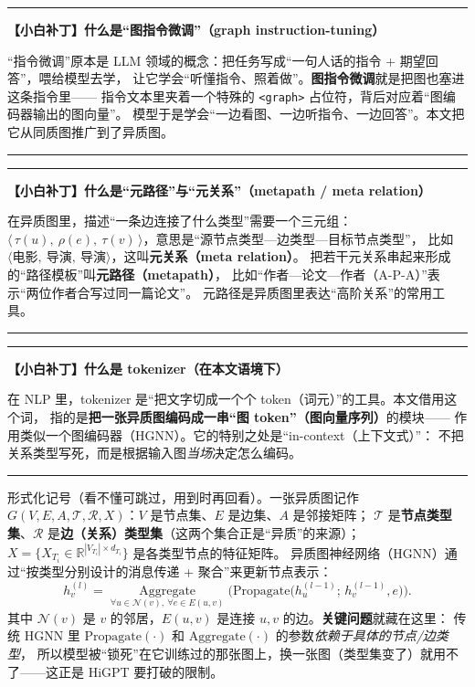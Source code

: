 \documentclass[11pt,UTF8,fontset=fandol]{ctexart}
\newenvironment{tip}[1]{%
  \par\smallskip\noindent\rule{\linewidth}{0.4pt}\par\nobreak
  \noindent\textbf{【小白补丁】#1}\par\nobreak\noindent\ignorespaces
}{%
  \par\noindent\rule{\linewidth}{0.4pt}\par\smallskip
}
\begin{document}
\begin{tip}{什么是“图指令微调”（graph instruction-tuning）}
“指令微调”原本是 LLM 领域的概念：把任务写成“一句人话的指令 + 期望回答”，喂给模型去学，
让它学会“听懂指令、照着做”。\textbf{图指令微调}就是把图也塞进这条指令里——
指令文本里夹着一个特殊的 \texttt{<graph>} 占位符，背后对应着“图编码器输出的图向量”。
模型于是学会“一边看图、一边听指令、一边回答”。本文把它从同质图推广到了异质图。
\end{tip}

\begin{tip}{什么是“元路径”与“元关系”（metapath / meta relation）}
在异质图里，描述“一条边连接了什么类型”需要一个三元组：
$\langle\,\tau(u),\ \rho(e),\ \tau(v)\,\rangle$，意思是“源节点类型—边类型—目标节点类型”，
比如 $\langle\text{电影},\ \text{导演},\ \text{导演}\rangle$，这叫\textbf{元关系（meta relation）}。
把若干元关系串起来形成的“路径模板”叫\textbf{元路径（metapath）}，
比如“作者—论文—作者（A-P-A）”表示“两位作者合写过同一篇论文”。
元路径是异质图里表达“高阶关系”的常用工具。
\end{tip}

\begin{tip}{什么是 tokenizer（在本文语境下）}
在 NLP 里，tokenizer 是“把文字切成一个个 token（词元）”的工具。本文借用这个词，
指的是\textbf{把一张异质图编码成一串“图 token”（图向量序列）}的模块——
作用类似一个图编码器（HGNN）。它的特别之处是“in-context（上下文式）”：
不把关系类型写死，而是根据输入图\emph{当场}决定怎么编码。
\end{tip}

形式化记号（看不懂可跳过，用到时再回看）。一张异质图记作
$G(V,E,A,\mathcal{T},\mathcal{R},X)$：$V$ 是节点集、$E$ 是边集、$A$ 是邻接矩阵；
$\mathcal{T}$ 是\textbf{节点类型集}、$\mathcal{R}$ 是\textbf{边（关系）类型集}（这两个集合正是“异质”的来源）；
$X=\{X_{T_i}\in\mathbb{R}^{|V_{T_i}|\times d_{T_i}}\}$ 是各类型节点的特征矩阵。
异质图神经网络（HGNN）通过“按类型分别设计的消息传递 + 聚合”来更新节点表示：
\begin{equation*}
  h_v^{(l)}=\operatorname*{Aggregate}_{\forall u\in\mathcal{N}(v),\ \forall e\in E(u,v)}
  \Big(\mathrm{Propagate}\big(h_u^{(l-1)};\,h_v^{(l-1)},e\big)\Big).\tag{1}
\end{equation*}
其中 $\mathcal{N}(v)$ 是 $v$ 的邻居，$E(u,v)$ 是连接 $u,v$ 的边。\textbf{关键问题}就藏在这里：
传统 HGNN 里 $\mathrm{Propagate}(\cdot)$ 和 $\mathrm{Aggregate}(\cdot)$ 的参数\emph{依赖于具体的节点/边类型}，
所以模型被“锁死”在它训练过的那张图上，换一张图（类型集变了）就用不了——这正是 HiGPT 要打破的限制。
\end{document}
